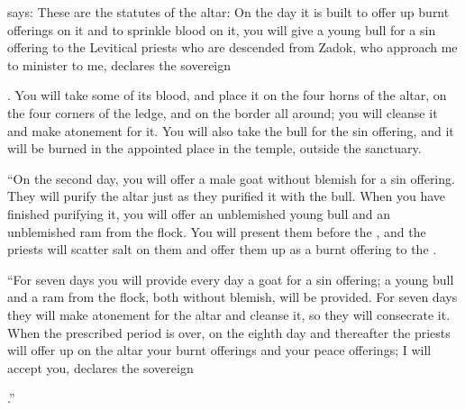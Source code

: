 {{}
says: These
are the statutes
of the altar: On the day
it
is built
to offer up
burnt offerings
on it
and to sprinkle
blood
on it,
you will give
a young
bull
for a sin offering
to
the Levitical
priests
who
are
descended
from Zadok,
who approach
me to minister
to me,
declares
the sovereign

{}.
You will take
some of its blood,
and place
it on
the four
horns
of the altar, on the four
corners
of the ledge,
and on the border
all around;
you will cleanse
it and make atonement for it.
You will also take
the bull
for the sin offering,
and it will be burned
in the appointed place
in the temple,
outside
the sanctuary.
\par }{\PP {}“On the second
day,
you will offer
a male
goat
without blemish
for a sin offering.
They will purify
the
altar
just
as they purified
it with the bull.
When you have finished
purifying
it,
you will offer
an unblemished young
bull
and an unblemished
ram
from
the flock.
You will present
them
before
the {}, and the priests
will scatter
salt
on
them
and offer them
up
as a burnt offering
to the
{}.
\par }{\PP {}“For seven
days
you will provide
every day
a goat
for a sin offering;
a young bull
and a ram
from
the flock,
both without blemish,
will be provided.
For seven
days
they will make atonement
for the altar
and cleanse
it, so they will consecrate it.
When
the
prescribed
period
is over, on
the eighth
day
and thereafter
the priests
will offer up on
the altar
your burnt offerings
and your peace offerings;
I will accept
you, declares
the sovereign

{}.”

\par }

